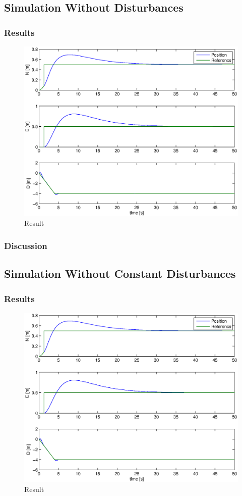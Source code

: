 \subsection{Simulation Without Disturbances}
\subsubsection{Results}
\begin{figure}[H]
\centering
\includegraphics[width = 17cm]{fig/plots/simulation/positionNoDisturbance.eps}
\caption{Result}
\end{figure}
\subsubsection{Discussion}
\subsection{Simulation Without Constant Disturbances}
\subsubsection{Results}
\begin{figure}[H]
\centering
\includegraphics[width = 17cm]{fig/plots/simulation/positionNoDisturbance.eps}
\caption{Result}
\end{figure}
